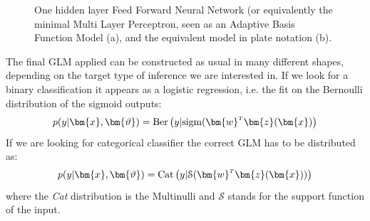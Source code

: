 %
\begin{figure}
    \centering
    \caption{One hidden layer Feed Forward Neural Network (or equivalently the minimal Multi Layer Perceptron, seen as an Adaptive Basis Function Model (a), and the equivalent model in plate notation (b). }
    \label{fig:generic_mlp}
\end{figure}
%
The final \acl{GLM} applied can be constructed as usual in many different shapes, depending on the target type of inference we are interested in. If we look for a binary classification it appears as a logistic regression, i.e. the fit on the Bernoulli distribution of the sigmoid outputs:
\begin{equation}
    p(y|\bm{x}, \bm{\vartheta}) = \text{Ber}\left( y|\text{sigm}(\transpose{\bm{w}}\bm{z}(\bm{x}) \right)
\end{equation}
If we are looking for categorical classifier the correct GLM has to be distributed as:
\begin{equation}
    p(y|\bm{x}, \bm{\vartheta}) = \text{Cat}\left( y|\mathcal{S}(\transpose{\bm{w}}\bm{z}(\bm{x})) \right)
\end{equation}
where the \textit{Cat} distribution is the Multinulli and $\mathcal{S}$ stands for the support function of the input.

